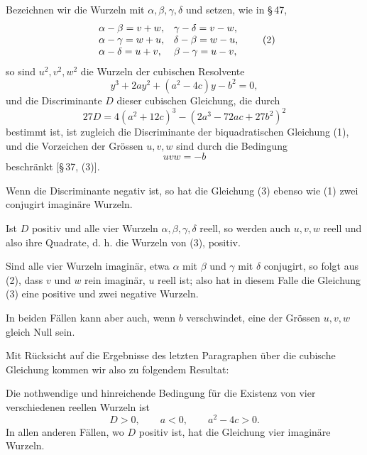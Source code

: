 \documentclass[11pt]{article}
\begin{document}
Bezeichnen wir die Wurzeln mit $\alpha,\beta,\gamma,\delta$ und setzen, wie in \S\,47,
\begin{equation}
\begin{array}{ll}
\alpha-\beta=v+w, & \gamma-\delta=v-w,\cr
\alpha-\gamma=w+u, & \delta-\beta=w-u,\cr
\alpha-\delta=u+v, & \beta-\gamma=u-v,
\end{array}
\tag{2}
\end{equation}
so sind $u^2,v^2,w^2$ die Wurzeln der cubischen Resolvente
\begin{equation}
        y^3+2ay^2+(a^2-4c)y-b^2=0,
\tag{3}
\end{equation}
und die Discriminante $D$ dieser cubischen Gleichung, die durch
\begin{equation}
        27D=4(a^2+12c)^3-(2a^3-72ac+27b^2)^2
\tag{4}
\end{equation}
bestimmt ist, ist zugleich die Discriminante der biquadratischen Gleichung (1), und die Vorzeichen der Gr\"ossen $u,v,w$ sind durch die Bedingung
\begin{equation}
        uvw=-b
\tag{5}
\end{equation}
beschr\"ankt [\S\,37, (3)].

Wenn die Discriminante negativ ist, so hat die Gleichung (3) ebenso wie (1) zwei conjugirt imagin\"are Wurzeln.

Ist $D$ positiv und alle vier Wurzeln $\alpha,\beta,\gamma,\delta$ reell, so werden auch $u,v,w$ reell und also ihre Quadrate, d. h. die Wurzeln von (3), positiv.

Sind alle vier Wurzeln imagin\"ar, etwa $\alpha$ mit $\beta$ und $\gamma$ mit $\delta$ conjugirt, so folgt aus (2), dass $v$ und $w$ rein imagin\"ar, $u$ reell ist; also hat in diesem Falle die Gleichung (3) eine positive und zwei negative Wurzeln.

In beiden F\"allen kann aber auch, wenn $b$ verschwindet, eine der Gr\"ossen $u,v,w$ gleich Null sein.

Mit R\"ucksicht auf die Ergebnisse des letzten Paragraphen \"uber die cubische Gleichung kommen wir also zu folgendem Resultat:

Die nothwendige und hinreichende Bedingung f\"ur die Existenz von vier verschiedenen reellen Wurzeln ist
\begin{equation}
        D>0,
        \qquad a<0,
        \qquad a^2-4c>0.
\tag{6}
\end{equation}
In allen anderen F\"allen, wo $D$ positiv ist, hat die Gleichung vier imagin\"are Wurzeln.
\end{document}
